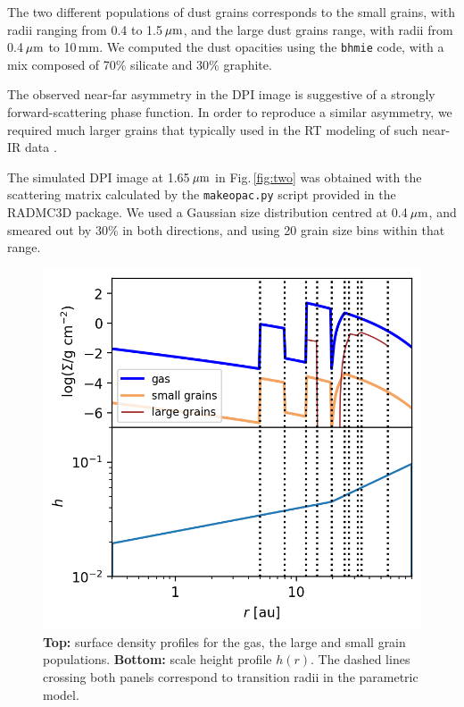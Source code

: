 \documentclass[letters,usenatbib,times]{mnras}
\begin{document}
The two different populations of dust grains corresponds to  the small grains, with  radii ranging  from 0.4 to 1.5\,$\hbox{$\mu$m}$, and the large dust grains range, with radii  from 0.4\,$\hbox{$\mu$m}$ to 10\,mm. We computed the dust opacities using the {\tt bhmie} code, with  a mix composed of  70\% silicate and 30\% graphite. 

The observed near-far asymmetry in the DPI image is suggestive of a strongly forward-scattering phase function. In order to reproduce a similar  asymmetry, we required much larger grains that typically used in the RT modeling of  such near-IR data \citep[e.g.][]{2018MNRAS.477.5104C}. 


The simulated DPI image at 1.65\,$\hbox{$\mu$m}$ in Fig.\,\ref{fig:two} was
obtained with the scattering matrix calculated by the {\tt makeopac.py}
script provided in the RADMC3D package. We used a  Gaussian size distribution centred at 0.4\,$\hbox{$\mu$m}$, and smeared  out by 30\% in both directions, and using 20 grain size bins within  that range. 

\begin{figure}
	\includegraphics[width=\columnwidth]{allprofiles.png}
        \caption{{\bf Top:}  surface density profiles for the gas, the large and small grain populations. {\bf Bottom:}  scale height profile $h(r)$. The dashed lines crossing both panels correspond to transition  radii in the parametric model.}
    \label{fig:profiles}
\end{figure}
\end{document}
